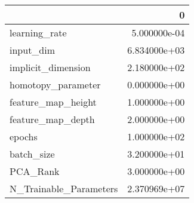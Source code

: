 \begin{tabular}{lr}
\toprule
{} &             0 \\
\midrule
learning\_rate          &  5.000000e-04 \\
input\_dim              &  6.834000e+03 \\
implicit\_dimension     &  2.180000e+02 \\
homotopy\_parameter     &  0.000000e+00 \\
feature\_map\_height     &  1.000000e+00 \\
feature\_map\_depth      &  2.000000e+00 \\
epochs                 &  1.000000e+02 \\
batch\_size             &  3.200000e+01 \\
PCA\_Rank               &  3.000000e+00 \\
N\_Trainable\_Parameters &  2.370969e+07 \\
\bottomrule
\end{tabular}
